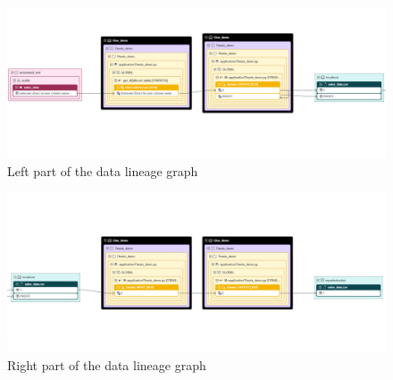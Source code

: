 \begin{figure}[ht]\centering
\includegraphics[angle=90,origin=c,height=1.0\textwidth]{img/thesis_demo2.PNG}
\caption{Left part of the data lineage graph}
\label{fig:thesisDemo2}
\end{figure}

\begin{figure}[ht]\centering
\includegraphics[angle=90,origin=c,height=1.0\textwidth]{img/thesis_demo3.PNG}
\caption{Right part of the data lineage graph}
\label{fig:thesisDemo3}
\end{figure}

